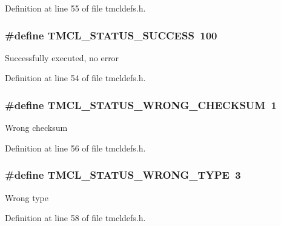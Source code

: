 Definition at line 55 of file tmcldefs.h.\hypertarget{group__StatusCodes_gae8f0d829c003e2daf2b4d659f10fb365}{
\subsubsection[{TMCL\_\-STATUS\_\-SUCCESS}]{\setlength{\rightskip}{0pt plus 5cm}\#define TMCL\_\-STATUS\_\-SUCCESS~100}}
\label{group__StatusCodes_gae8f0d829c003e2daf2b4d659f10fb365}
Successfully executed, no error 

Definition at line 54 of file tmcldefs.h.\hypertarget{group__StatusCodes_gaf588b372da14d242fc4ecb4e144b5085}{
\subsubsection[{TMCL\_\-STATUS\_\-WRONG\_\-CHECKSUM}]{\setlength{\rightskip}{0pt plus 5cm}\#define TMCL\_\-STATUS\_\-WRONG\_\-CHECKSUM~1}}
\label{group__StatusCodes_gaf588b372da14d242fc4ecb4e144b5085}
Wrong checksum 

Definition at line 56 of file tmcldefs.h.\hypertarget{group__StatusCodes_ga9fffa59df78430367ff93cabf36f72c6}{
\subsubsection[{TMCL\_\-STATUS\_\-WRONG\_\-TYPE}]{\setlength{\rightskip}{0pt plus 5cm}\#define TMCL\_\-STATUS\_\-WRONG\_\-TYPE~3}}
\label{group__StatusCodes_ga9fffa59df78430367ff93cabf36f72c6}
Wrong type 

Definition at line 58 of file tmcldefs.h.
